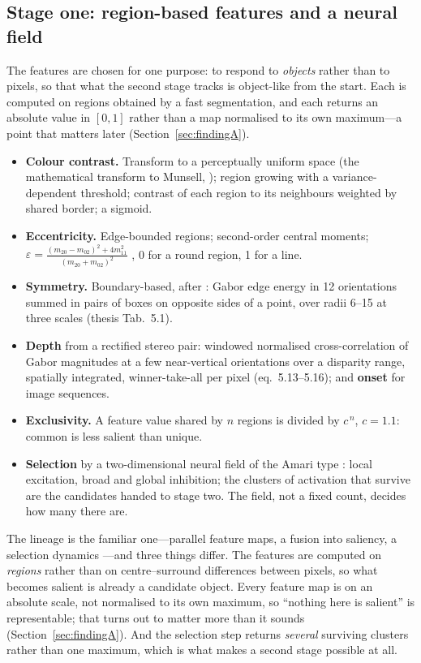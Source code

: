 \documentclass[11pt,a4paper]{article}
\begin{document}
\subsection{Stage one: region-based features and a neural field}
The features are chosen for one purpose: to respond to \emph{objects} rather
than to pixels, so that what the second stage tracks is object-like from the
start. Each is computed on regions obtained by a fast segmentation, and each
returns an absolute value in $[0,1]$ rather than a map normalised to its own
maximum---a point that matters later (Section~\ref{sec:findingA}).
\begin{itemize}
  \item \textbf{Colour contrast.} Transform to a perceptually uniform space
        (the mathematical transform to Munsell, \citealp{miyahara1988}); region
        growing with a variance-dependent threshold; contrast of each region to
        its neighbours weighted by shared border; a sigmoid.
  \item \textbf{Eccentricity.} Edge-bounded regions; second-order central
        moments; $\varepsilon = \frac{(m_{20}-m_{02})^2 + 4m_{11}^2}{(m_{20}+m_{02})^2}$
        \citep{jaehne}, 0 for a round region, 1 for a line.
  \item \textbf{Symmetry.} Boundary-based, after \citet{bollmann1997}: Gabor edge
        energy in 12 orientations summed in pairs of boxes on opposite sides of a
        point, over radii 6--15 at three scales (thesis Tab.~5.1).
  \item \textbf{Depth} from a rectified stereo pair: windowed normalised
        cross-correlation of Gabor magnitudes at a few near-vertical
        orientations over a disparity range, spatially integrated, winner-take-all
        per pixel (eq.~5.13--5.16); and \textbf{onset} for image sequences.
  \item \textbf{Exclusivity.} A feature value shared by $n$ regions is divided
        by $c^{\,n}$, $c = 1.1$: common is less salient than unique.
  \item \textbf{Selection} by a two-dimensional neural field of the Amari type
        \citep{amari1977}: local excitation, broad and global inhibition; the
        clusters of activation that survive are the candidates handed to stage
        two. The field, not a fixed count, decides how many there are.
\end{itemize}
The lineage is the familiar one---parallel feature maps, a fusion into saliency,
a selection dynamics \citep{treisman1980,koch1985,itti1998,borji2013survey}---and
three things differ. The features are computed on \emph{regions} rather than on
centre--surround differences between pixels, so what becomes salient is already
a candidate object. Every feature map is on an absolute scale, not normalised to
its own maximum, so ``nothing here is salient'' is representable; that turns out
to matter more than it sounds (Section~\ref{sec:findingA}). And the selection
step returns \emph{several} surviving clusters rather than one maximum, which is
what makes a second stage possible at all.
\end{document}
